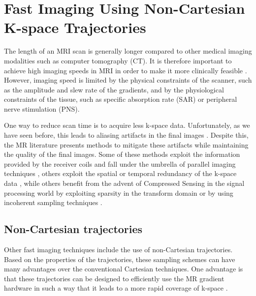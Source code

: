 \hfill 

\section{Fast Imaging Using Non-Cartesian K-space Trajectories}\label{chapterlabel2sec13}

The length of an MRI scan is generally longer compared to other medical imaging modalities such as computer tomography (CT).
It is therefore important to achieve high imaging speeds in MRI in order to make it more clinically feasible \cite{Cohen1991}.
However, imaging speed is limited by the physical constraints of the scanner, such as the amplitude and slew rate of the gradients, and by the physiological constraints of the tissue, such as specific absorption rate (SAR) or peripheral nerve stimulation (PNS).

\hfill

One way to reduce scan time is to acquire less k-space data.
Unfortunately, as we have seen before, this leads to aliasing artifacts in the final images \cite{Pusey1988}.
Despite this, the MR literature presents methods to mitigate these artifacts while maintaining the quality of the final images.
Some of these methods exploit the information provided by the receiver coils and fall under the umbrella of parallel imaging techniques \cite{Griswold2002} \cite{Pruessmann2001} \cite{Pruessmann1999} \cite{Seiberlich2008}, 
others exploit the spatial or temporal redundancy of the k-space data \cite{Tsao2012} \cite{Jung2009} \cite{Tsao2003},
while others benefit from the advent of Compressed Sensing in the signal processing world by exploiting sparsity in the transform domain \cite{Lustig2007} \cite{Pedersen2009} or by using incoherent sampling techniques \cite{Candes2006} \cite{Haldar2011}.

\hfill

\subsection{Non-Cartesian trajectories}

Other fast imaging techniques include the use of non-Cartesian trajectories.
Based on the properties of the trajectories, these sampling schemes can have many advantages over the conventional Cartesian techniques.
One advantage is that these trajectories can be designed to efficiently use the MR gradient hardware in such a way that it leads to a more rapid coverage of k-space \cite{Wright2014}.

